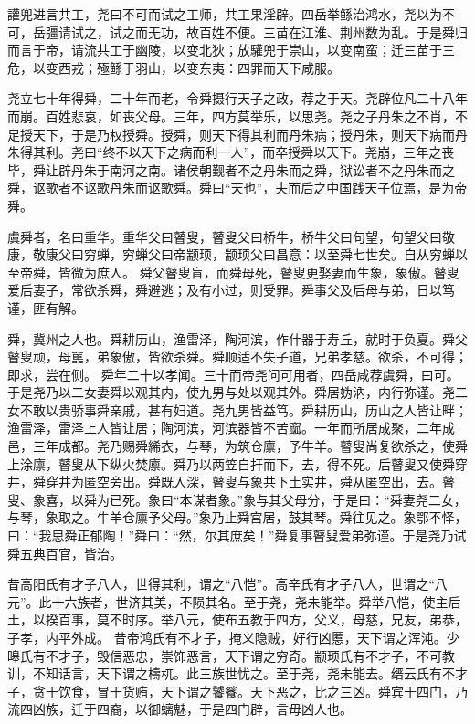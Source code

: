\documentclass[UTF8,12pt,AutoFakeBold,fontset=fandol]{ctexart}
\begin{document}
	讙兜进言共工，尧曰不可而试之工师，共工果淫辟。四岳举鲧治鸿水，尧以为不可，岳彊请试之，试之而无功，故百姓不便。三苗在江淮、荆州数为乱。于是舜归而言于帝，请流共工于幽陵，以变北狄；放驩兜于崇山，以变南蛮；迁三苗于三危，以变西戎；殛鲧于羽山，以变东夷：四罪而天下咸服。
	\par
	尧立七十年得舜，二十年而老，令舜摄行天子之政，荐之于天。尧辟位凡二十八年而崩。百姓悲哀，如丧父母。三年，四方莫举乐，以思尧。尧之子丹朱之不肖，不足授天下，于是乃权授舜。授舜，则天下得其利而丹朱病；授丹朱，则天下病而丹朱得其利。尧曰“终不以天下之病而利一人”，而卒授舜以天下。尧崩，三年之丧毕，舜让辟丹朱于南河之南。诸侯朝觐者不之丹朱而之舜，狱讼者不之丹朱而之舜，讴歌者不讴歌丹朱而讴歌舜。舜曰“天也”，夫而后之中国践天子位焉，是为帝舜。
	\par
	虞舜者，名曰重华。重华父曰瞽叟，瞽叟父曰桥牛，桥牛父曰句望，句望父曰敬康，敬康父曰穷蝉，穷蝉父曰帝颛顼，颛顼父曰昌意：以至舜七世矣。自从穷蝉以至帝舜，皆微为庶人。
	舜父瞽叟盲，而舜母死，瞽叟更娶妻而生象，象傲。瞽叟爱后妻子，常欲杀舜，舜避逃；及有小过，则受罪。舜事父及后母与弟，日以笃谨，匪有解。
	\par
	舜，冀州之人也。舜耕历山，渔雷泽，陶河滨，作什器于寿丘，就时于负夏。舜父瞽叟顽，母嚚，弟象傲，皆欲杀舜。舜顺适不失子道，兄弟孝慈。欲杀，不可得；即求，尝在侧。
	舜年二十以孝闻。三十而帝尧问可用者，四岳咸荐虞舜，曰可。于是尧乃以二女妻舜以观其内，使九男与处以观其外。舜居妫汭，内行弥谨。尧二女不敢以贵骄事舜亲戚，甚有妇道。尧九男皆益笃。舜耕历山，历山之人皆让畔；渔雷泽，雷泽上人皆让居；陶河滨，河滨器皆不苦窳。一年而所居成聚，二年成邑，三年成都。尧乃赐舜絺衣，与琴，为筑仓廪，予牛羊。瞽叟尚复欲杀之，使舜上涂廪，瞽叟从下纵火焚廪。舜乃以两笠自扞而下，去，得不死。后瞽叟又使舜穿井，舜穿井为匿空旁出。舜既入深，瞽叟与象共下土实井，舜从匿空出，去。瞽叟、象喜，以舜为已死。象曰“本谋者象。”象与其父母分，于是曰：“舜妻尧二女，与琴，象取之。牛羊仓廪予父母。”象乃止舜宫居，鼓其琴。舜往见之。象鄂不怿，曰：“我思舜正郁陶！”舜曰：“然，尔其庶矣！”舜复事瞽叟爱弟弥谨。于是尧乃试舜五典百官，皆治。
	\par
	昔高阳氏有才子八人，世得其利，谓之“八恺”。高辛氏有才子八人，世谓之“八元”。此十六族者，世济其美，不陨其名。至于尧，尧未能举。舜举八恺，使主后土，以揆百事，莫不时序。举八元，使布五教于四方，父义，母慈，兄友，弟恭，子孝，内平外成。
	昔帝鸿氏有不才子，掩义隐贼，好行凶慝，天下谓之浑沌。少暤氏有不才子，毁信恶忠，崇饰恶言，天下谓之穷奇。颛顼氏有不才子，不可教训，不知话言，天下谓之檮杌。此三族世忧之。至于尧，尧未能去。缙云氏有不才子，贪于饮食，冒于货贿，天下谓之饕餮。天下恶之，比之三凶。舜宾于四门，乃流四凶族，迁于四裔，以御螭魅，于是四门辟，言毋凶人也。
	
\end{document}
